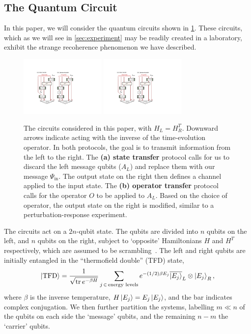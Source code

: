 \documentclass[aps,pra,reprint,floatfix,superscriptaddress, nofootinbib,longbibliography,onecolumn,notitlepage,12pt, tightenlines]{revtex4-1}
\DeclareMathOperator{\tr}{tr}
\newcommand{\ot}{\otimes}
\begin{document}
\subsection{The Quantum Circuit}
In this paper, we will consider the quantum circuits shown in \cref{fig:Wormhole_Circuit}. These circuits, which as we will see in \cref{sec:experiment} may be readily created in a laboratory, exhibit the strange recoherence phenomenon we have described.


\begin{figure}
\includegraphics[width=4.2cm]{044_a.pdf}
\qquad\qquad\qquad
\includegraphics[width=4.2cm]{044_b.pdf}
\caption{The circuits considered in this paper, with $H_L = H_R^T$. Downward arrows indicate acting with the inverse of the time-evolution operator. In both protocols, the goal is to transmit information from the left to the right. 
The \textbf{(a) state transfer} protocol calls for us to discard the left message qubits ($A_L$) and replace them with our message $\Psi_{\mathrm{in}}$. The output state on the right then defines a channel applied to the input state.
The \textbf{(b) operator transfer} protocol calls for the operator $O$ to be applied to $A_L$. Based on the choice of operator, the output state on the right is modified, similar to a perturbation-response experiment. \label{fig:Wormhole_Circuit}}
\end{figure}

The circuits act on a $2n$-qubit state. The qubits are divided into $n$ qubits on the left, and $n$ qubits on the right,  subject to `opposite' Hamiltonians $H$ and $H^T$ respectively, which are assumed to be scrambling~\cite{Sekino_2008, Hayden:2007cs}. The left and right qubits are initially entangled in the ``thermofield double'' (TFD) state,
\begin{equation}\label{eq:TFD}
    \ket{\mathrm{TFD}}
= \frac{1}{\sqrt{\tr{e^{-\beta H}}}}
    \sum_{j \, \in \,  \textrm{energy levels}}  %
    e^{-(1/2)\beta E_j} \overline{\ket {E_j}}_L \ot  \ket {E_j}_R,
\end{equation}
where $\beta$ is the inverse temperature, $H \ket {E_j} = E_j \ket {E_j}$, and the bar indicates complex conjugation. We then further partition the systems, labelling $m \ll n$ of the qubits on each side the `message' qubits, and the remaining $n-m$ the `carrier' qubits.
\end{document}
